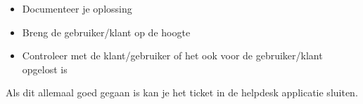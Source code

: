 \begin{itemize}
\item Documenteer je oplossing
\item Breng de gebruiker/klant op de hoogte
\item Controleer met de klant/gebruiker of het ook voor de gebruiker/klant opgelost is
\end{itemize}
Als dit allemaal goed gegaan is kan je het ticket in de helpdesk applicatie sluiten.
